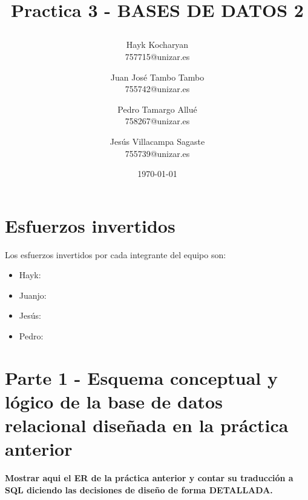 \documentclass{article}
\begin{document}
\begin{titlepage}
	\title{
		\begin{Huge}
			Practica 3 - BASES DE DATOS 2
		\end{Huge}
	}
	\author{
	  Hayk Kocharyan\\
	  757715@unizar.es
	  \and
	  Juan José Tambo Tambo\\
	  755742@unizar.es
	  \and
	  Pedro Tamargo Allué\\
	  758267@unizar.es
	  \and
	  Jesús Villacampa Sagaste\\
	  755739@unizar.es
	}
	\date{\today}
	
	\clearpage\maketitle
	\thispagestyle{empty}
	\tableofcontents

\end{titlepage}

\newpage 

\section{Esfuerzos invertidos}
Los esfuerzos invertidos por cada integrante del equipo son:
\begin{itemize}
\item Hayk:

\item Juanjo:	

\item Jesús:

\item Pedro: 

\end{itemize}

\section{Parte 1 - Esquema conceptual y lógico de la base de datos relacional diseñada en la práctica anterior}

\textbf{Mostrar aqui el ER de la práctica anterior y contar su traducción a SQL diciendo las decisiones de diseño de forma DETALLADA.}
\end{document}
